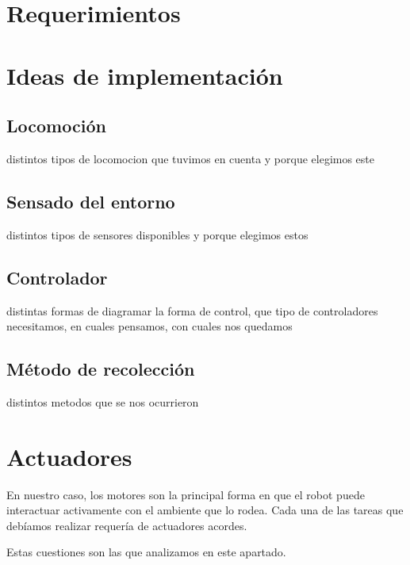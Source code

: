 \section{Requerimientos}
\label{h_requerimientos}

\section{Ideas de implementaci\'on}
\label{h_ideas}

\subsection{Locomoci\'on}
\label{h_ideas_locomocion}

distintos tipos de locomocion que tuvimos en cuenta y porque elegimos este

\subsection{Sensado del entorno}
\label{h_ideas_sensado}

distintos tipos de sensores disponibles y porque elegimos estos

\subsection{Controlador}
\label{h_ideas_controlador}

distintas formas de diagramar la forma de control, que tipo de controladores necesitamos, en cuales pensamos, con cuales nos quedamos

\subsection{M\'etodo de recolecci\'on}
\label{h_ideas_recoleccion}

distintos metodos que se nos ocurrieron

\section{Actuadores}
\label{h_actuadores}

En nuestro caso, los motores son la principal forma en que el robot puede interactuar activamente con el ambiente que lo rodea.
Cada una de las tareas que deb\'iamos realizar requer\'ia de actuadores acordes.

Estas cuestiones son las que analizamos en este apartado.

